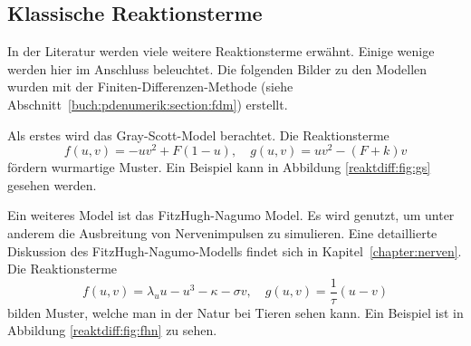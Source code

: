\subsection{Klassische Reaktionsterme}
In der Literatur werden viele weitere Reaktionsterme erwähnt.
Einige wenige werden hier im Anschluss beleuchtet.
Die folgenden Bilder zu den Modellen wurden mit der
Finiten-Differenzen-Methode
(siehe Abschnitt~\ref{buch:pdenumerik:section:fdm})
erstellt.
%


Als erstes wird das Gray-Scott-Model berachtet.
%
%
Die Reaktionsterme
\begin{equation}
     f(u,v) = -uv^2 + F(1 - u), \quad g(u,v) = uv^2 - (F + k)v
     \label{reaktdiff:equ:gs}
\end{equation}
fördern wurmartige Muster.
Ein Beispiel kann in Abbildung \ref{reaktdiff:fig:gs} gesehen werden.


Ein weiteres Model ist das FitzHugh-Nagumo Model.
%
%
Es wird genutzt, um unter anderem die Ausbreitung von Nervenimpulsen
zu simulieren.
%
Eine detaillierte Diskussion des FitzHugh-Nagumo-Modells findet sich in
Kapitel~\ref{chapter:nerven}.
Die Reaktionsterme
\begin{equation}
    f(u,v) = \lambda_u u - u^3 - \kappa - \sigma v, \quad g(u,v) = \frac{1}{\tau}(u - v)
    \label{reaktdiff:equ:fhn}
\end{equation}
bilden Muster, welche man in der Natur bei Tieren sehen kann.
Ein Beispiel ist in Abbildung \ref{reaktdiff:fig:fhn} zu sehen.


